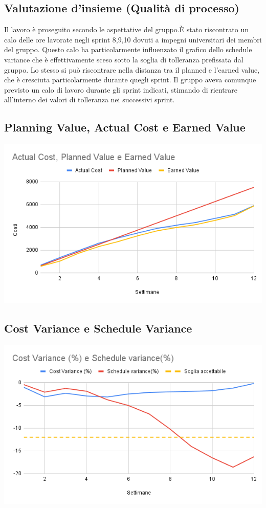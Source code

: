 \documentclass[12pt]{article}
\begin{document}
\subsection{Valutazione d’insieme (Qualità di processo)}
Il lavoro è proseguito secondo le aspettative del gruppo.È stato riscontrato un calo delle ore lavorate negli sprint 8,9,10 dovuti a impegni universitari dei membri del gruppo. Questo calo ha particolarmente influenzato il grafico dello schedule variance che è effettivamente sceso sotto la soglia di tolleranza prefissata dal gruppo. Lo stesso si può riscontrare nella distanza tra il planned e l’earned value, che è cresciuta particolarmente durante quegli sprint. Il gruppo aveva comunque previsto un calo di lavoro durante gli sprint indicati, stimando di rientrare all’interno dei valori di tolleranza nei successivi sprint. 

\subsection{Planning Value, Actual Cost e Earned Value}
\begin{center}
	\includegraphics[scale=0.5]{AC_PV_EV.png}
\end{center}
\subsection{Cost Variance e Schedule Variance}
\begin{center}
	\includegraphics[scale=0.5]{Cost_Variance_Schedule_Variance.png}
\end{center}
\end{document}
